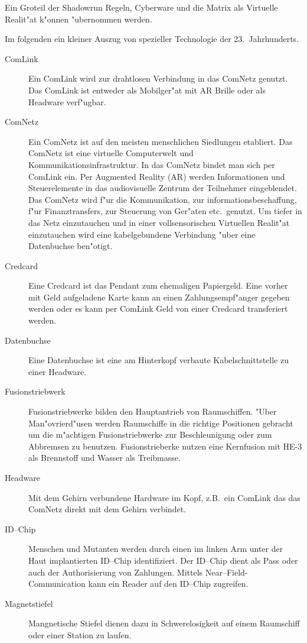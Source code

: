 \begin{appendices}
Ein Gro\3teil der Shadowrun Regeln, Cyberware und die Matrix als Virtuelle Realit"at k"onnen "ubernommen werden.

Im folgenden ein kleiner Auszug von spezieller Technologie der 23.~Jahrhunderts.

\begin{description}
\item [ComLink] Ein ComLink wird zur drahtlosen Verbindung in das ComNetz genutzt. Das ComLink ist entweder als
      Mobilger"at mit AR Brille oder als Headware verf"ugbar.
\item [ComNetz] Ein ComNetz ist auf den meisten menschlichen Siedlungen etabliert. Das ComNetz ist eine virtuelle
      Computerwelt und Kommunikationsinfrastruktur. In das ComNetz bindet man sich per ComLink ein. Per Augmented Reality (AR) werden Informationen und Steuerelemente in das audiovisuelle Zentrum der Teilnehmer eingeblendet. Das ComNetz wird f"ur die Kommunikation, zur informationsbeschaffung, f"ur Finanztransfers, zur Steuerung von Ger"aten etc.~genutzt. Um tiefer in das Netz einzutauchen und in einer vollsensorischen Virtuellen Realit"at einzutauchen wird eine kabelgebundene Verbindung "uber eine Datenbuchse ben"otigt.
\item [Credcard] Eine Credcard ist das Pendant zum ehemaligen Papiergeld. Eine vorher mit Geld aufgeladene Karte kann an
      einen Zahlungsempf"anger gegeben werden oder es kann per ComLink Geld von einer Credcard transferiert werden.
\item [Datenbuchse] Eine Datenbuchse ist eine am Hinterkopf verbaute Kabelschnittstelle zu einer Headware.
\item [Fusionstriebwerk] Fusionstriebwerke bilden den Hauptantrieb von Raumschiffen. "Uber Man"ovrierd"usen werden
      Raumschiffe in die richtige Positionen gebracht um die m"achtigen Fusionstriebwerke zur Beschleunigung oder zum Abbremsen zu benutzen. Fusionstrieberke nutzen eine Kernfusion mit HE-3 als Brennstoff und Wasser als Treibmasse.
\item [Headware] Mit dem Gehirn verbundene Hardware im Kopf, z.B.~ein ComLink das das ComNetz direkt mit dem Gehirn
      verbindet.
\item [ID--Chip] Menschen und Mutanten werden durch einen im linken Arm unter der Haut implantierten ID--Chip
      identifiziert. Der ID--Chip dient als Pass oder auch der Authorisierung von Zahlungen. Mittels Near--Field-Communication kann ein Reader auf den ID--Chip zugreifen.
\item [Magnetstiefel] Mangnetische Stiefel dienen dazu in Schwerelosigkeit auf einem Raumschiff oder einer Station zu laufen.

\end{description}
\end{appendices}
